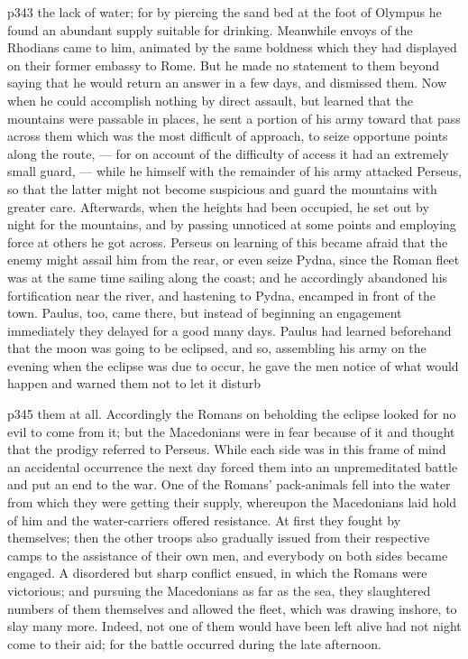 p343 the lack of water; for by piercing the sand bed at the foot of Olympus he found an abundant supply suitable for drinking. Meanwhile envoys of the Rhodians came to him, animated by the same boldness which they had displayed on their former embassy to Rome. But he made no statement to them beyond saying that he would return an answer in a few days, and dismissed them. Now when he could accomplish nothing by direct assault, but learned that the mountains were passable in places, he sent a portion of his army toward that pass across them which was the most difficult of approach, to seize opportune points along the route, \texthebrew{—} for on account of the difficulty of access it had an extremely small guard, \texthebrew{—} while he himself with the remainder of his army attacked Perseus, so that the latter might not become suspicious and guard the mountains with greater care. Afterwards, when the heights had been occupied, he set out by night for the mountains, and by passing unnoticed at some points and employing force at others he got across. Perseus on learning of this became afraid that the enemy might assail him from the rear, or even seize Pydna, since the Roman fleet was at the same time sailing along the coast; and he accordingly abandoned his fortification near the river, and hastening to Pydna, encamped in front of the town. Paulus, too, came there, but instead of beginning an engagement immediately they delayed for a good many days. Paulus had learned beforehand that the moon was going to be eclipsed, and so, assembling his army on the evening when the eclipse was due to occur, he gave the men notice of what would happen and warned them not to let it disturb

p345 them at all. Accordingly the Romans on beholding the eclipse looked for no evil to come from it; but the Macedonians were in fear because of it and thought that the prodigy referred to Perseus. While each side was in this frame of mind an accidental occurrence the next day forced them into an unpremeditated battle and put an end to the war. One of the Romans' pack-animals fell into the water from which they were getting their supply, whereupon the Macedonians laid hold of him and the water-carriers offered resistance. At first they fought by themselves; then the other troops also gradually issued from their respective camps to the assistance of their own men, and everybody on both sides became engaged. A disordered but sharp conflict ensued, in which the Romans were victorious; and pursuing the Macedonians as far as the sea, they slaughtered numbers of them themselves and allowed the fleet, which was drawing inshore, to slay many more. Indeed, not one of them would have been left alive had not night come to their aid; for the battle occurred during the late afternoon.

